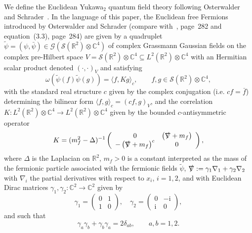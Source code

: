 \documentclass{article}
\newcommand{\assign}{:=}
\newcommand{\mathi}{\mathrm{i}}
\newcommand{\slashnabla}{\slashed{\nabla}}
\begin{document}
We define the Euclidean Yukawa$_2$ quantum field theory following Osterwalder
and Schrader~{\cite{osterwalder_euclidean_1973-2}}. In the language of this
paper, the Euclidean free Fermions introduced by Osterwalder and Schrader
(compare with~{\cite{osterwalder_euclidean_1973-2}}, page~282 and
equation~(3.3), page~284) are given by a quadruplet $\tilde{\psi} = (\psi,
\bar{\psi}) \in \mathcal{G} (\mathcal{S} (\mathbb{R}^2) \otimes \mathbb{C}^4)$
of complex Grassmann Gaussian fields on the complex pre-Hilbert space $V
=\mathcal{S} (\mathbb{R}^2) \otimes \mathbb{C}^4 \subseteq L^2 (\mathbb{R}^2)
\otimes \mathbb{C}^4$ with an Hermitian scalar product denoted $(\cdot,
\cdot)_V$ and satisfying
\begin{equation}
  \omega (\tilde{\psi} (f) \tilde{\psi} (g)) = \langle f, K g \rangle_c,
  \label{eq:free-corrrelation} \qquad f, g \in \mathcal{S} (\mathbb{R}^2)
  \otimes \mathbb{C}^4,
\end{equation}
with the standard real structure $c$ given by the complex conjugation (i.e. $c
f = \bar{f}$) determining the bilinear form $\langle f, g \rangle_c = (c f,
g)_V$, and the correlation $K : L^2 (\mathbb{R}^2) \otimes \mathbb{C}^4
\rightarrow L^2 (\mathbb{R}^2) \otimes \mathbb{C}^4$ given by the bounded
$c$-antisymmetric operator
\begin{equation}
  K = (m_f^2 - \Delta)^{- 1} \left(\begin{array}{cc}
    0 & \left( \slashnabla + m_f \right)\\
    - \left( \slashnabla + m_f \right)^c & 0
  \end{array}\right), \label{eq:matrixK}
\end{equation}
where $\Delta$ is the Laplacian on $\mathbb{R}^2$, $m_f > 0$ is a constant
interpreted as the mass of the fermionic particle associated with the
fermionic fields $\tilde{\psi}$, $\slashnabla \assign \gamma_1 \nabla_1 +
\gamma_2 \nabla_2$ with $\nabla_i$ the partial derivatives with respect to
$x_i$, $i = 1, 2$, and with Euclidean Dirac matrices $\gamma_1, \gamma_2 :
\mathbb{C}^2 \rightarrow \mathbb{C}^2$ given by
\[ \gamma_1 = \left(\begin{array}{cc}
     0 & 1\\
     1 & 0
   \end{array}\right), \quad \gamma_2 = \left(\begin{array}{cc}
     0 & - \mathi\\
     \mathi & 0
   \end{array}\right), \]
and such that
\[ \gamma_a \gamma_b + \gamma_b \gamma_a = 2 \delta_{a b}, \qquad a, b = 1, 2.
\]
\end{document}
